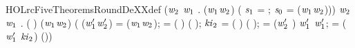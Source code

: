 \begin{SaveVerbatim}{HOLrcFiveTheoremsRoundDeXXdef}
\HOLTokenTurnstile{} (\HOLSymConst{\HOLTokenForall{}}\ensuremath{\HOLBoundVar{w}\sb{\mathrm{2}}} \ensuremath{\HOLBoundVar{w}\sb{\mathrm{1}}} .
         (\ensuremath{\HOLBoundVar{w}\sb{\mathrm{1}}}\HOLSymConst{,}\ensuremath{\HOLBoundVar{w}\sb{\mathrm{2}}}) \HOLSymConst{=}
      ( \ensuremath{\HOLBoundVar{s}\sb{\mathrm{1}}} =   ; \ensuremath{\HOLBoundVar{s}\sb{\mathrm{0}}} =     (\ensuremath{\HOLBoundVar{w}\sb{\mathrm{1}}}\HOLSymConst{,}\ensuremath{\HOLBoundVar{w}\sb{\mathrm{2}}}))) \HOLSymConst{\HOLTokenConj{}}
   \HOLSymConst{\HOLTokenForall{}}\ensuremath{\HOLBoundVar{w}\sb{\mathrm{2}}} \ensuremath{\HOLBoundVar{w}\sb{\mathrm{1}}}  .
      ( )  (\ensuremath{\HOLBoundVar{w}\sb{\mathrm{1}}}\HOLSymConst{,}\ensuremath{\HOLBoundVar{w}\sb{\mathrm{2}}}) \HOLSymConst{=}
     (
        (\ensuremath{\HOLBoundVar{w}\sb{\mathrm{1}}\sp{\prime{}}}\HOLSymConst{,}\ensuremath{\HOLBoundVar{w}\sb{\mathrm{2}}\sp{\prime{}}}) =    (\ensuremath{\HOLBoundVar{w}\sb{\mathrm{1}}}\HOLSymConst{,}\ensuremath{\HOLBoundVar{w}\sb{\mathrm{2}}});
         =  ( \HOLSymConst{\HOLTokenProd{}}   \HOLSymConst{\ensuremath{-}} ) ( );
        \ensuremath{\HOLBoundVar{ki}\sb{\mathrm{2}}} =  ( \HOLSymConst{\HOLTokenProd{}}   \HOLSymConst{\ensuremath{-}} ) ( );
         = (\ensuremath{\HOLBoundVar{w}\sb{\mathrm{2}}\sp{\prime{}}} \HOLSymConst{\ensuremath{-}} ) \HOLSymConst{\HOLTokenRor{}}  \ensuremath{\HOLBoundVar{w}\sb{\mathrm{1}}\sp{\prime{}}} \HOLSymConst{\HOLTokenEor{}} \ensuremath{\HOLBoundVar{w}\sb{\mathrm{1}}\sp{\prime{}}};
         = (\ensuremath{\HOLBoundVar{w}\sb{\mathrm{1}}\sp{\prime{}}} \HOLSymConst{\ensuremath{-}} \ensuremath{\HOLBoundVar{ki}\sb{\mathrm{2}}}) \HOLSymConst{\HOLTokenRor{}}   \HOLSymConst{\HOLTokenEor{}} 
        (\HOLSymConst{,}))
\end{SaveVerbatim}
